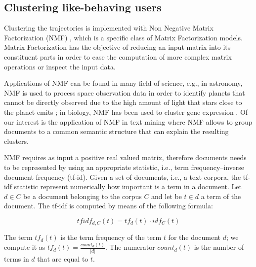 \subsection{Clustering like-behaving users}
Clustering the trajectories is implemented 
with Non Negative Matrix Factorization (NMF)
\cite{nmf:majorcontribution:1999}, which is a specific class of Matrix Factorization models. Matrix Factorization has the objective of reducing an input matrix into its constituent parts in order to ease the computation of more complex matrix operations or inspect the input data. 

Applications of NMF can be found in many field of science, e.g., in astronomy, NMF is used to process space observation data in order to identify planets that cannot be directly observed due to the high amount of light that stars close to the planet emits \cite{nmf_astronomy:2018}; in biology, NMF has been used to cluster gene expression \cite{nmf_biology:2012}. Of our interest is the application of NMF in text mining where NMF allows to group documents to a common semantic structure that can explain the resulting clusters.

NMF requires as input a positive real valued matrix, therefore documents needs to be represented by using an appropriate statistic, i.e., term frequency–inverse document frequency (tf-id). Given a set of documents, i.e., a text corpora, the tf-idf statistic represent numerically how important is a term in a document. Let $d \in C$ be a document belonging to the corpus $C$ and let be $t \in d$ a term of the document. The tf-idf is computed by means of the following formula:

$$tfidf_{d,C}(t) = tf_d(t) \cdot idf_C(t)$$

The term $tf_d(t)$ is the term frequency of the term $t$ for the document $d$; we compute it as 
$tf_d(t) = \frac{count_{d}(t)}{|d|}$. The numerator $count_d(t)$ is the number of terms in $d$ that are equal to $t$. 

